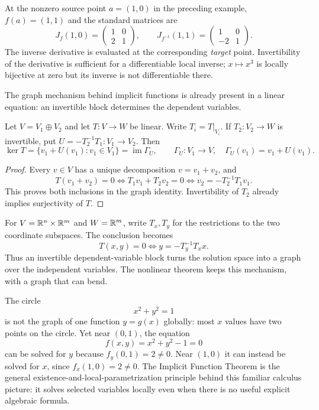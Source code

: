 At the nonzero source point $a=(1,0)$ in the preceding example,
$f(a)=(1,1)$ and the standard matrices are
\[
J_f(1,0)=\begin{pmatrix}1&0\\2&1\end{pmatrix},\qquad
J_{f^{-1}}(1,1)=\begin{pmatrix}1&0\\-2&1\end{pmatrix}.
\]
The inverse derivative is evaluated at the corresponding \emph{target}
point. Invertibility of the derivative is sufficient for a differentiable
local inverse; $x\mapsto x^3$ is locally bijective at zero but its inverse
is not differentiable there.

The graph mechanism behind implicit functions is already present in a
linear equation: an invertible block determines the dependent variables.
\begin{theorem}\label{thm:linear-implicit}
Let $V=V_1\oplus V_2$ and let $T:V\to W$ be linear. Write
$T_i=T|_{V_i}$. If $T_2:V_2\to W$ is invertible, put
$U=-T_2^{-1}T_1:V_1\to V_2$. Then
\[
\ker T=\{v_1+U(v_1):v_1\in V_1\}
       =\operatorname{im}\Gamma_U,
\qquad \Gamma_U:V_1\to V,\quad \Gamma_U(v_1)=v_1+U(v_1).
\]
\end{theorem}
\begin{proof}
Every $v\in V$ has a unique decomposition $v=v_1+v_2$, and
\[
T(v_1+v_2)=0
\iff T_1v_1+T_2v_2=0
\iff v_2=-T_2^{-1}T_1v_1.
\]
This proves both inclusions in the graph identity. Invertibility of $T_2$
already implies surjectivity of $T$.
\end{proof}
For $V=\mathbb{R}^n\times\mathbb{R}^m$ and $W=\mathbb{R}^m$, write $T_x,T_y$ for the
restrictions to the two coordinate subspaces. The conclusion becomes
\[
T(x,y)=0\iff y=-T_y^{-1}T_xx.
\]
Thus an invertible dependent-variable block turns the solution space into
a graph over the independent variables. The nonlinear theorem keeps this
mechanism, with a graph that can bend.

\begin{remark}
The circle
\[
x^2+y^2=1
\]
is not the graph of one function $y=g(x)$ globally: most $x$ values have two
points on the circle.  Yet near $(0,1)$, the equation
\[
f(x,y)=x^2+y^2-1=0
\]
can be solved for $y$ because $f_y(0,1)=2\ne0$.  Near $(1,0)$ it can instead
be solved for $x$, since $f_x(1,0)=2\ne0$.  The Implicit Function Theorem
is the general existence-and-local-parametrization principle behind this
familiar calculus picture: it solves selected variables locally even when
there is no useful explicit algebraic formula.
\end{remark}

